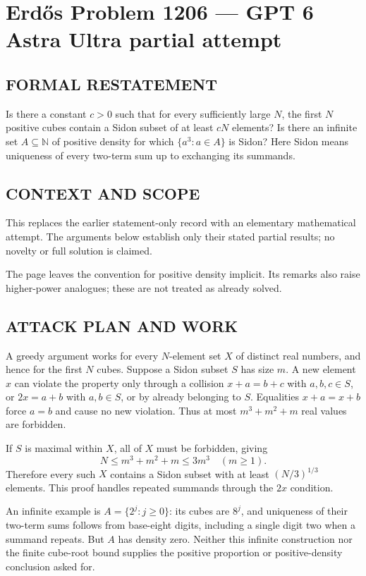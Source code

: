 \section*{Erd\H{o}s Problem 1206 --- GPT 6 Astra Ultra partial attempt}


\subsection*{FORMAL RESTATEMENT}
Is there a constant $c>0$ such that for every sufficiently large $N$, the first $N$ positive cubes contain a Sidon subset of at least $cN$ elements? Is there an infinite set $A\subseteq\mathbb N$ of positive density for which $\{a^3:a\in A\}$ is Sidon? Here Sidon means uniqueness of every two-term sum up to exchanging its summands.

\subsection*{CONTEXT AND SCOPE}
This replaces the earlier statement-only record with an elementary mathematical attempt. The arguments below establish only their stated partial results; no novelty or full solution is claimed.

The page leaves the convention for positive density implicit. Its remarks also raise higher-power analogues; these are not treated as already solved.

\subsection*{ATTACK PLAN AND WORK}
A greedy argument works for every $N$-element set $X$ of distinct real numbers,
and hence for the first $N$ cubes. Suppose a Sidon subset $S$ has size $m$.
A new element $x$ can violate the property only through a collision
$x+a=b+c$ with $a,b,c\in S$, or $2x=a+b$ with $a,b\in S$,
or by already belonging to $S$. Equalities $x+a=x+b$ force $a=b$ and cause
no new violation. Thus at most $m^3+m^2+m$ real values are forbidden.

If $S$ is maximal within $X$, all of $X$ must be forbidden, giving
\[N\le m^3+m^2+m\le3m^3\quad(m\ge1).
\]
Therefore every such $X$ contains a Sidon subset with at least $(N/3)^{1/3}$
elements. This proof handles repeated summands through the $2x$ condition.

An infinite example is $A=\{2^j:j\ge0\}$: its cubes are $8^j$, and uniqueness
of their two-term sums follows from base-eight digits, including a single digit
two when a summand repeats. But $A$ has density zero. Neither this infinite
construction nor the finite cube-root bound supplies the positive proportion
or positive-density conclusion asked for.

